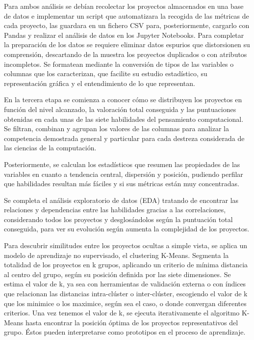 \documentclass[a4paper, 12pt]{book}
\begin{document}
Para ambos análisis se debían recolectar los proyectos almacenados en una base de datos e implementar un script que automatizara la recogida de las métricas de cada proyecto, las guardara en un fichero CSV para, posteriormente, cargarlo con Pandas y realizar el análisis de datos en los Jupyter Notebooks. Para completar la preparación de los datos se requiere eliminar datos espurios que distorsionen su comprensión, descartando de la muestra los proyectos duplicados o con atributos incompletos. Se formatean mediante la conversión de tipos de las variables o columnas que los caracterizan, que facilite su estudio estadístico, su representación gráfica y el entendimiento de lo que representan.

En la tercera etapa se comienza a conocer cómo se distribuyen los proyectos en función del nivel alcanzado, la valoración total conseguida y las puntuaciones obtenidas en cada unas de las siete habilidades del pensamiento computacional. Se filtran, combinan y agrupan los valores de las columnas para analizar la competencia demostrada general y particular para cada destreza considerada de las ciencias de la computación. 

Posteriormente, se calculan los estadísticos que resumen las propiedades de las variables en cuanto a tendencia central, dispersión y posición, pudiendo perfilar que habilidades resultan más fáciles y si sus métricas están muy concentradas. 

Se completa el análisis exploratorio de datos (EDA) tratando de encontrar las relaciones y dependencias entre las habilidades gracias a las correlaciones, considerando todos los proyectos y desglosándolos según la puntuación total conseguida, para ver su evolución según aumenta la complejidad de los proyectos.

Para descubrir similitudes entre los proyectos ocultas a simple vista, se aplica un modelo de aprendizaje no supervisado, el clustering K-Means. Segmenta la totalidad de los proyectos en k grupos, aplicando un criterio de mínima distancia al centro del grupo, según su posición definida por las siete dimensiones. Se estima el valor de k, ya sea con herramientas de validación externa o con índices que relacionan las distancias intra-clúster o inter-clúster, escogiendo el valor de k que los minimice o los maximice, según sea el caso, o donde convergan diferentes criterios. Una vez tenemos el valor de k, se ejecuta iterativamente el algoritmo K-Means hasta encontrar la posición óptima de los proyectos representativos del grupo. Éstos pueden interpretarse como prototipos en el proceso de aprendizaje.
\end{document}
